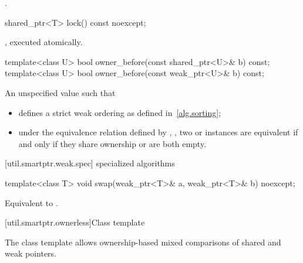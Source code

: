 \begin{itemdescr}
\pnum\returns  {}.
\end{itemdescr}

%
\begin{itemdecl}
shared_ptr<T> lock() const noexcept;
\end{itemdecl}

\begin{itemdescr}
\pnum
\returns {}, executed atomically.
\end{itemdescr}

%
\begin{itemdecl}
template<class U> bool owner_before(const shared_ptr<U>& b) const;
template<class U> bool owner_before(const weak_ptr<U>& b) const;
\end{itemdecl}

\begin{itemdescr}
\pnum
\returns An unspecified value such that

\begin{itemize}
\item {} defines a strict weak ordering as defined in~\ref{alg.sorting};

\item under the equivalence relation defined by ,
, two  or
 instances are equivalent if and only if they share ownership or are
both empty.
\end{itemize}
\end{itemdescr}


[util.smartptr.weak.spec]{ specialized algorithms}

%
\begin{itemdecl}
template<class T>
  void swap(weak_ptr<T>& a, weak_ptr<T>& b) noexcept;
\end{itemdecl}

\begin{itemdescr}
\pnum\effects  Equivalent to .
\end{itemdescr}

[util.smartptr.ownerless]{Class template }

\pnum
The class template  allows ownership-based mixed comparisons of shared
and weak pointers.

